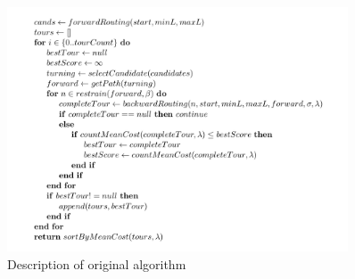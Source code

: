 \documentclass{ctuthesis}
\begin{document}
\begin{figure}
	\includegraphics[width=0.9\textwidth]{pseudocode}
	\caption{Description of original algorithm}
	\label{fig:pseudocode}
\end{figure}

 \par
\end{document}
